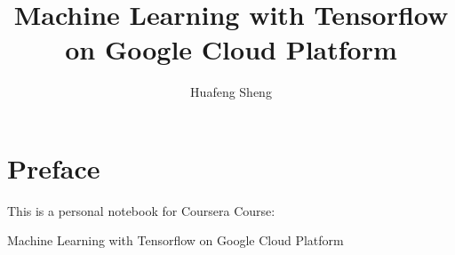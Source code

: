 \documentclass[9pt,twocolumn,oneside,a4paper]{book}
\theoremstyle{plain}
\theoremstyle{definition}
\theoremstyle{remark}
\begin{document}
	\frontmatter%
	\title{\textbf{Machine Learning with Tensorflow\\on Google Cloud Platform}}
	\author{Huafeng Sheng}
	\maketitle
	\tableofcontents
	
	\chapter{Preface}
	This is a personal notebook for Coursera Course: 
	
	Machine Learning with Tensorflow on Google Cloud Platform
	
	\mainmatter%
	
	\medskip
%	
%	
	
	\backmatter%
	
\end{document}

